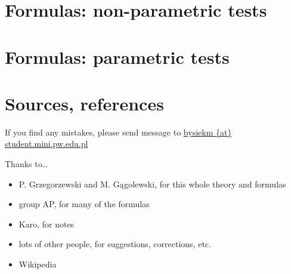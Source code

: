\documentclass{article}
\begin{document}
\section*{Formulas: non-parametric tests}
\begin{multicols}{2}

\end{multicols}

\newpage

\thispagestyle{empty}

\section*{Formulas: parametric tests}
\begin{multicols}{2}

\end{multicols}

\newpage

\section{Sources, references}

If you find any mistakes, please send message to \url{bysiekm {at} student.mini.pw.edu.pl}

\vspace{10pt} \noindent Thanks to\ldots
\begin{itemize}
  \item P. Grzegorzewski and M. Gągolewski, for this whole theory and formulas
  \item group AP, for many of the formulas
  \item Karo, for notes
  \item lots of other people, for suggestions, corrections, etc.
  \item Wikipedia
\end{itemize}
\end{document}
